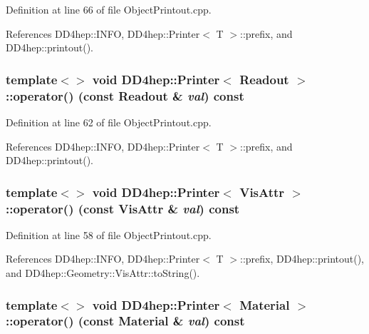 Definition at line 66 of file ObjectPrintout.cpp.

References DD4hep::INFO, DD4hep::Printer$<$ T $>$::prefix, and DD4hep::printout().\hypertarget{struct_d_d4hep_1_1_printer_a81f7b0ce01f9aa05f670dab7bfcd0926}{
\subsubsection[{operator()}]{\setlength{\rightskip}{0pt plus 5cm}template$<$$>$ void {\bf DD4hep::Printer}$<$ {\bf Readout} $>$::operator() (const {\bf Readout} \& {\em val}) const}}
\label{struct_d_d4hep_1_1_printer_a81f7b0ce01f9aa05f670dab7bfcd0926}


Definition at line 62 of file ObjectPrintout.cpp.

References DD4hep::INFO, DD4hep::Printer$<$ T $>$::prefix, and DD4hep::printout().\hypertarget{struct_d_d4hep_1_1_printer_a75af40a21128f843605984b619878a7e}{
\subsubsection[{operator()}]{\setlength{\rightskip}{0pt plus 5cm}template$<$$>$ void {\bf DD4hep::Printer}$<$ {\bf VisAttr} $>$::operator() (const {\bf VisAttr} \& {\em val}) const}}
\label{struct_d_d4hep_1_1_printer_a75af40a21128f843605984b619878a7e}


Definition at line 58 of file ObjectPrintout.cpp.

References DD4hep::INFO, DD4hep::Printer$<$ T $>$::prefix, DD4hep::printout(), and DD4hep::Geometry::VisAttr::toString().\hypertarget{struct_d_d4hep_1_1_printer_a28d6e698fccdabcfda67d3460012355a}{
\subsubsection[{operator()}]{\setlength{\rightskip}{0pt plus 5cm}template$<$$>$ void {\bf DD4hep::Printer}$<$ {\bf Material} $>$::operator() (const {\bf Material} \& {\em val}) const}}
\label{struct_d_d4hep_1_1_printer_a28d6e698fccdabcfda67d3460012355a}


